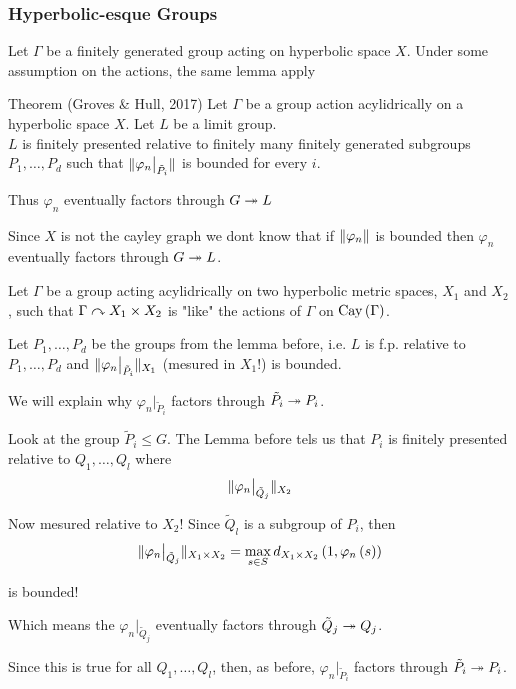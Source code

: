 \documentclass[handout]{beamer}[10]
\begin{document}
\begin{frame}
    \frametitle{Hyperbolic-esque Groups}
    Let $\Gamma$ be a finitely generated group acting on hyperbolic space $X$. Under some assumption on the actions, the same lemma apply

    \begin{block}{Theorem (Groves \& Hull, 2017)}
        Let $\Gamma$ be a group action acylidrically on a hyperbolic space $X$. Let $L$ be a limit group. \\
        
        $L$ is finitely presented relative to finitely many finitely generated subgroups $P_1, \ldots, P_d$ such that $\lVert \varphi_{n}\big\vert_{\tilde{P}_i} \rVert$ is bounded for every $i$.

        Thus $\varphi_n$ eventually factors through $G \twoheadrightarrow L$
    \end{block}



    Since $X$ is not the cayley graph we dont know that if $\lVert \varphi_n \rVert$ is bounded then $\varphi_n$ eventually factors through $G\twoheadrightarrow L$.
\end{frame}

\begin{frame}
    Let $\Gamma$ be a group acting acylidrically on two hyperbolic metric spaces, $X_1$ and $X_2$, such that $\Gamma \curvearrowright X_1 \times X_2$ is "like" the actions of $\Gamma$ on $\operatorname{Cay}\left( \Gamma \right)$.

    Let $P_1, \ldots, P_d$ be the groups from the lemma before, i.e. $L$ is f.p. relative to $P_1, \ldots, P_d$ and $\lVert \varphi_{n}\big\vert_{\tilde{P}_i} \rVert_{X_1}$ (mesured in $X_1$!) is bounded.

    \vspace{2ex}

    We will explain why $\varphi_{n}\big\vert_{\tilde{P}_i}$ factors through $\tilde{P}_i \twoheadrightarrow P_i$. 
\end{frame}


\begin{frame}
    Look at the group $\tilde{P}_i \leq G$. The Lemma before tels us that $P_i$ is finitely presented relative to $Q_1, \ldots, Q_l$ where
    \begin{equation*}
        \lVert \varphi_{n}\big\vert_{\tilde{Q}_j} \rVert_{X_2}
    \end{equation*}

    Now mesured relative to $X_2$!
    Since $\tilde{Q}_l$ is a subgroup of $P_i$, then 
    \begin{equation*}
        \lVert \varphi_{n}\big\vert_{\tilde{Q}_j} \rVert_{X_1 \times X_2} = \max_{s\in S} d_{X_1 \times X_2} \left( 1, \varphi_n \left( s \right) \right)
    \end{equation*} 

    is bounded!

    Which means the $\varphi_{n}\big\vert_{\tilde{Q}_j}$ eventually factors through $\tilde{Q}_j \twoheadrightarrow Q_j$. 

    Since this is true for all $Q_1, \ldots, Q_l$, then, as before, $\varphi_{n}\big\vert_{\tilde{P}_i}$ factors through $\tilde{P}_i \twoheadrightarrow P_i$.

\end{frame}
\end{document}
